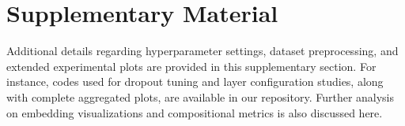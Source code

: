\documentclass{article} %
\theoremstyle{plain}
\theoremstyle{definition}
\theoremstyle{remark}
\begin{document}



\appendix

\section*{\LARGE Supplementary Material}
\label{sec:appendix}
Additional details regarding hyperparameter settings, dataset preprocessing, and extended experimental plots are provided in this supplementary section. For instance, codes used for dropout tuning and layer configuration studies, along with complete aggregated plots, are available in our repository. Further analysis on embedding visualizations and compositional metrics is also discussed here.
\end{document}

